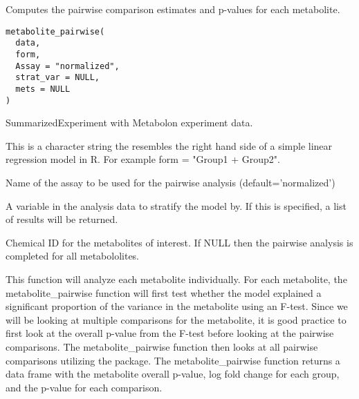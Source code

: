 \documentclass[a4paper]{book}
\begin{document}
%
\begin{Description}
Computes the pairwise comparison estimates and p-values for each metabolite.
\end{Description}
%
\begin{Usage}
\begin{verbatim}
metabolite_pairwise(
  data,
  form,
  Assay = "normalized",
  strat_var = NULL,
  mets = NULL
)
\end{verbatim}
\end{Usage}
%
\begin{Arguments}
\begin{ldescription}
\item[\code{data}] SummarizedExperiment with Metabolon experiment data.

\item[\code{form}] This is a character string the resembles the right hand side of
a simple linear regression model in R. For example form = "Group1 + Group2".

\item[\code{Assay}] Name of the assay to be used for the pairwise analysis
(default='normalized')

\item[\code{strat\_var}] A variable in the analysis data to stratify the model by.
If this is specified, a list of results will be returned.

\item[\code{mets}] Chemical ID for the metabolites of interest. If NULL then the
pairwise analysis is completed for all metabololites.
\end{ldescription}
\end{Arguments}
%
\begin{Details}
This function will analyze each metabolite individually. For each
metabolite, the metabolite\_pairwise function
will first test whether the model explained a significant proportion
of the variance in the metabolite using an F-test. Since we will be looking
at multiple comparisons for the metabolite, it is good practice to first look
at the overall p-value from the F-test before looking at the pairwise
comparisons.
The metabolite\_pairwise function then looks at all pairwise comparisons
utilizing the
package. The metabolite\_pairwise function returns a data frame with the
metabolite overall p-value, log fold change for each group, and the p-value
for each comparison.
\end{Details}
\end{document}

